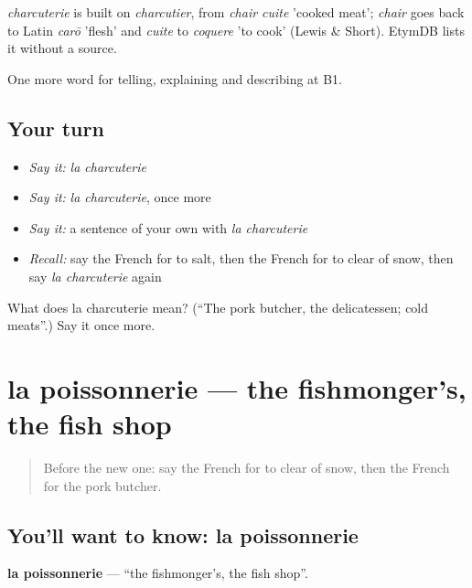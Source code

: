 \begin{cousinweb}
\emph{charcuterie} is built on \emph{charcutier}, from \emph{chair cuite} 'cooked meat'; \emph{chair} goes back to Latin \emph{carō} 'flesh' and \emph{cuite} to \emph{coquere} 'to cook' (Lewis \& Short). EtymDB lists it without a source.
\end{cousinweb}

\begin{grammarlens}[title={What you've built}]
One more word for telling, explaining and describing at B1.
\end{grammarlens}

\subsection*{Your turn}
\begin{itemize}
\raggedright
  \item \emph{Say it:} \emph{la charcuterie}
  \item \emph{Say it:} \emph{la charcuterie}, once more
  \item \emph{Say it:} a sentence of your own with \emph{la charcuterie}
  \item \emph{Recall:} say the French for to salt, then the French for to clear of snow, then say \emph{la charcuterie} again
\end{itemize}

\begin{tcolorbox}[breakable,colback=teal!4,colframe=teal!35!black,title={Before you move on}]
What does la charcuterie mean? (\textquotedblleft{}The pork butcher, the delicatessen; cold meats\textquotedblright{}.) Say it once more.
\end{tcolorbox}
\section[la poissonnerie]{la poissonnerie — the fishmonger’s, the fish shop}

\label{lesson:FR-C444-poissonnerie}



\begin{quote}
Before the new one: say the French for to clear of snow, then the French for the pork butcher.
\end{quote}

\subsection*{You'll want to know: la poissonnerie}
\textbf{la poissonnerie} — \textquotedblleft{}the fishmonger’s, the fish shop\textquotedblright{}.

